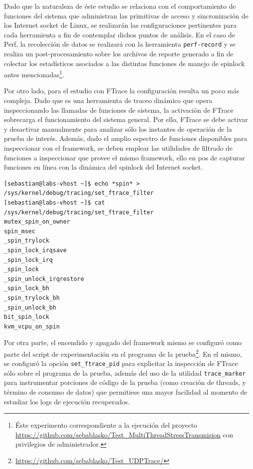 Dado que la naturaleza de éste estudio se relaciona con el comportamiento de funciones del sistema que administran las primitivas de acceso y sincronización de los Internet socket de Linux, se realizarán las configuraciones pertinentes para cada herramienta a fin de contemplar dichos puntos de análisis. En el caso de Perf, la recolección de datos se realizará con la herramienta \verb=perf-record= y se realiza un post-procesamiento sobre los archivos de reporte generado a fin de colectar los estadísticos asociados a las distintas funciones de manejo de spinlock antes mencionadas\footnote{Éste experimento correspondiente a la ejecución del proyecto \url{https://github.com/sebablasko/Test_MultiThreadStressTransmision} con privilegios de administrador.}.

Por otro lado, para el estudio con FTrace la configuración resulta un poco más compleja. Dado que es una herramienta de traceo dinámico que opera inspeccionando las llamadas de funciones de sistema, la activación de FTrace sobrecarga el funcionamiento del sistema general. Por ello, FTrace se debe activar y desactivar manualmente para analizar sólo los instantes de operación de la prueba de interés. Además, dado el amplio espectro de funciones disponibles para inspeccionar con el framework, se deben emplear las utilidades de filtrado de funciones a inspeccionar que provee el mismo framework, ello en pos de capturar funciones en línea con la dinámica del spinlock del Internet socket.

\vspace{1pc}
\begin{lstlisting}[style=BashInputStyle, label={code:ftrace}, caption={Configuración de filtros de FTrace sobre funciones a estudiar.}, captionpos=b]
[sebastian@labs-vhost ~]$ echo *spin* > /sys/kernel/debug/tracing/set_ftrace_filter 
[sebastian@labs-vhost ~]$ cat /sys/kernel/debug/tracing/set_ftrace_filter 
mutex_spin_on_owner
spin_msec
_spin_trylock
_spin_lock_irqsave
_spin_lock_irq
_spin_lock
_spin_unlock_irqrestore
_spin_lock_bh
_spin_trylock_bh
_spin_unlock_bh
bit_spin_lock
kvm_vcpu_on_spin
\end{lstlisting}

Por otra parte, el encendido y apagado del framework mismo se configuró como parte del script de experimentación en el programa de la prueba\footnote{\url{https://github.com/sebablasko/Test_UDPTrace/}}. En el mismo, se configuró la opción \verb=set_ftrace_pid= para explicitar la inspección de FTrace sólo sobre el programa de la prueba, además del uso de la utilidad \verb=trace_marker= para instrumentar porciones de código de la prueba (como creación de threads, y término de consumo de datos) que permitiese una mayor facilidad al momento de estudiar los logs de ejecución recuperados.


